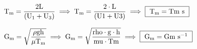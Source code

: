 \documentclass{article}
\newcommand{\myspace}{0.5cm}
\begin{document}
\vspace{\myspace}

\begin{center}
	$
		\mathrm
		{
			T_{m} = \dfrac{2L}{\left ( U_{1} + U_{3} \right)}
		} 
		\implies
		\mathrm
		{
			T_{m} = \dfrac{2\cdot {{L}} }{\left ( {{U1}} + {{U3}} \right)}
		}
		\implies 
		\fbox
		{ 
			$\mathrm
			{
				T_{m}= {{Tm}} \ s
			}$
		}
	$
\end{center}

\vspace{\myspace}

\begin{center}
	$
		\mathrm
		{
			G_{m} = \sqrt{\dfrac{\rho g h}{\mu T_{m}}}
		} 
		\implies
		\mathrm
		{
			G_{m} = \sqrt{\dfrac{ {{rho}} \cdot {{g}} \cdot  {{h}} }{ {{mu}} \cdot {{Tm}} }} } 
		\implies 
		\fbox
		{
			$\mathrm
			{
				G_{m} = {{Gm}} \ s^{-1}
			}$
		}
	$
\end{center}
\end{document}

